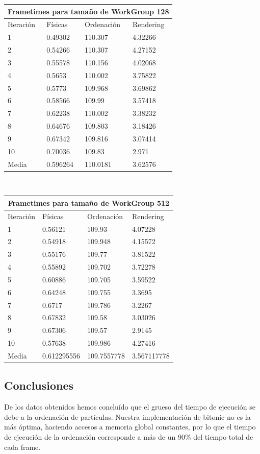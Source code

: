 \documentclass[10pt,oneside,a4paper]{article}
\begin{document}
\begin{tabular}{ |p{1.3cm}||p{2cm}|p{2cm}|p{2cm}| }
 \hline
 \multicolumn{4}{|c|}{Frametimes para tamaño de WorkGroup 128} \\
 \hline
 Iteración& Físicas&Ordenación&Rendering\\
 \hline
1&0.49302&110.307&4.32266\\
2&0.54266&110.307&4.27152\\
3&0.55578&110.156&4.02068\\
4&0.5653&110.002&3.75822\\
5&0.5773&109.968&3.69862\\
6&0.58566&109.99&3.57418\\
7&0.62238&110.002&3.38232\\
8&0.64676&109.803&3.18426\\
9&0.67342&109.816&3.07414\\
10&0.70036&109.83&2.971\\
Media&0.596264&110.0181&3.62576\\
 \hline
\end{tabular}\\\vspace{1cm}

\begin{tabular}{ |p{1.3cm}||p{2cm}|p{2cm}|p{2cm}| }
 \hline
 \multicolumn{4}{|c|}{Frametimes para tamaño de WorkGroup 512} \\
 \hline
 Iteración& Físicas&Ordenación&Rendering\\
 \hline
1&0.56121&109.93&4.07228\\
2&0.54918&109.948&4.15572\\
3&0.55176&109.77&3.81522\\
4&0.55892&109.702&3.72278\\
5&0.60886&109.705&3.59522\\
6&0.64248&109.755&3.3695\\
7&0.6717&109.786&3.2267\\
8&0.67832&109.58&3.03026\\
9&0.67306&109.57&2.9145\\
10&0.57638&109.986&4.27416\\
Media&0.612295556&109.7557778&3.567117778\\
 \hline
\end{tabular}

\subsection{Conclusiones}
De los datos obtenidos hemos concluído que el grueso del tiempo de ejecución se debe a la ordenación de partículas. Nuestra implementación de bitonic no es la más óptima, haciendo accesos a memoria global constantes, por lo que el tiempo de ejecución de la ordenación corresponde a más de un 90\% del tiempo total de cada frame.\\
\end{document}
